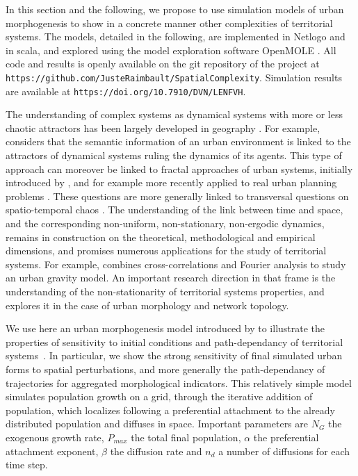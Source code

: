 \documentclass[11pt]{article}
\begin{document}
In this section and the following, we propose to use simulation models of urban morphogenesis to show in a concrete manner other complexities of territorial systems. The models, detailed in the following, are implemented in Netlogo \citep{wilensky1999netlogo} and in scala, and explored using the model exploration software OpenMOLE \citep{reuillon2013openmole}. All code and results is openly available on the git repository of the project at \texttt{https://github.com/JusteRaimbault/SpatialComplexity}. Simulation results are available at \texttt{https://doi.org/10.7910/DVN/LENFVH}.


The understanding of complex systems as dynamical systems with more or less chaotic attractors has been largely developed in geography \citep{dauphine1995chaos}. For example, \cite{e18060197} considers that the semantic information of an urban environment is linked to the attractors of dynamical systems ruling the dynamics of its agents. This type of approach can moreover be linked to fractal approaches of urban systems, initially introduced by \cite{batty1994fractal}, and for example more recently applied to real urban planning problems \citep{yamu2015spatial}. These questions are more generally linked to transversal questions on spatio-temporal chaos \citep{crutchfield1987phenomenology}. The understanding of the link between time and space, and the corresponding non-uniform, non-stationary, non-ergodic dynamics, remains in construction on the theoretical, methodological and empirical dimensions, and promises numerous applications for the study of territorial systems. For example, \cite{chen2009urban} combines cross-correlations and Fourier analysis to study an urban gravity model. An important research direction in that frame is the understanding of the non-stationarity of territorial systems properties, and \cite{raimbault2018urban} explores it in the case of urban morphology and network topology.



We use here an urban morphogenesis model introduced by \cite{raimbault2018calibration} to illustrate the properties of sensitivity to initial conditions and path-dependancy of territorial systems~\citep{pumain2012urban}. In particular, we show the strong sensitivity of final simulated urban forms to spatial perturbations, and more generally the path-dependancy of trajectories for aggregated morphological indicators. This relatively simple model simulates population growth on a grid, through the iterative addition of population, which localizes following a preferential attachment to the already distributed population and diffuses in space. Important parameters are $N_G$ the exogenous growth rate, $P_{max}$ the total final population, $\alpha$ the preferential attachment exponent, $\beta$ the diffusion rate and $n_d$ a number of diffusions for each time step.
\end{document}
